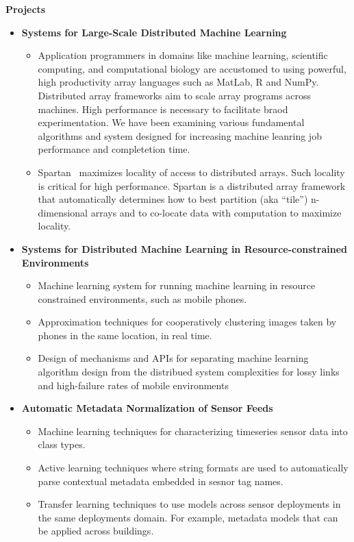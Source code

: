 \documentclass[letterpaper,11pt]{article}
\newcommand{\resitem}[1]{\item #1 \vspace{-2pt}}
\newcommand{\resheading}[1]{{\large \colorbox{mygrey}{\begin{minipage}{\textwidth}{\textbf{#1 \vphantom{p\^{E}}}}\end{minipage}}}}
\begin{document}
\resheading{Projects}
\begin{itemize}
    \item {\textbf{Systems for Large-Scale Distributed Machine Learning}}
            \begin{itemize}
                \resitem{Application programmers in domains like machine learning, scientific computing, and computational biology are accustomed to using powerful, high productivity array languages such as MatLab, R and NumPy. Distributed array frameworks aim to scale array programs across machines. High performance is necessary to facilitate braod experimentation.  We have been examining various fundamental algorithms and system designed for increasing machine leanring job performance and completetion time.}
                \resitem{Spartan~\cite{spartan} maximizes locality of access to distributed arrays. Such locality is critical for high performance.  Spartan is a distributed array framework that automatically determines how to best partition (aka “tile”) n-dimensional arrays and to co-locate data with computation to maximize locality.}
            \end{itemize}

    \item {\textbf{Systems for Distributed Machine Learning in Resource-constrained Environments}}
        \begin{itemize}
            \resitem{Machine learning system for running machine learning in resource constrained environments, such as mobile phones.}
            \resitem{Approximation techniques for cooperatively clustering images taken by phones in the same location, in real time.}
            \resitem{Design of mechanisms and APIs for separating machine learning algorithm design from the distribued system complexities for lossy links and high-failure rates of mobile environments} 
        \end{itemize}

    \item {\textbf{Automatic Metadata Normalization of Sensor Feeds}}
        \begin{itemize}
            \resitem{Machine learning techniques for characterizing timeseries sensor data into class types.}
            \resitem{Active learning techniques where string formats are used to automatically parse contextual metadata embedded in sesnor tag names.\cite{Arka_buildsys2015}}
            \resitem{Transfer learning techniques to use models across sensor deployments in the same deployments domain.  For example, metadata models that can be applied across buildings.~\cite{Fontugne:2013:SBS:2461381.2461399,Hong:2013:TAS:2528282.2528302,Dezhi_buildsys2015}}
        \end{itemize}
\end{itemize}
\end{document}
